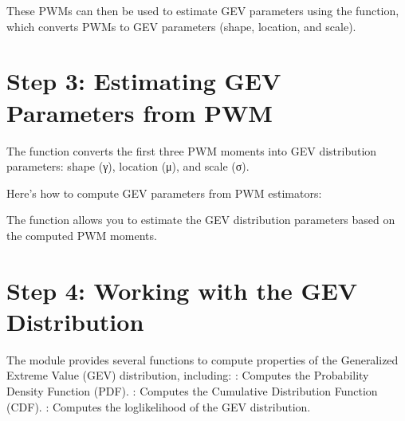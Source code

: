 \documentclass[a4paper,11pt,openany,english]{sphinxmanual}
\begin{document}
\sphinxAtStartPar
These PWMs can then be used to estimate GEV parameters using the  function, which converts PWMs to GEV parameters (shape, location, and scale).


\section{Step 3: Estimating GEV Parameters from PWM}
\label{\detokenize{miscellaneous:step-3-estimating-gev-parameters-from-pwm}}
\sphinxAtStartPar
The function  converts the first three PWM moments into GEV distribution parameters: shape (γ), location (μ), and scale (σ).

\sphinxAtStartPar
Here’s how to compute GEV parameters from PWM estimators:

\begin{sphinxVerbatim}[commandchars=\\\{\}]
   

      

      
\end{sphinxVerbatim}

\sphinxAtStartPar
The  function allows you to estimate the GEV distribution parameters based on the computed PWM moments.


\section{Step 4: Working with the GEV Distribution}
\label{\detokenize{miscellaneous:step-4-working-with-the-gev-distribution}}
\sphinxAtStartPar
The module provides several functions to compute properties of the Generalized Extreme Value (GEV) distribution, including:
\sphinxhyphen{} : Computes the Probability Density Function (PDF).
\sphinxhyphen{} : Computes the Cumulative Distribution Function (CDF).
\sphinxhyphen{} : Computes the log\sphinxhyphen{}likelihood of the GEV distribution.
\end{document}

